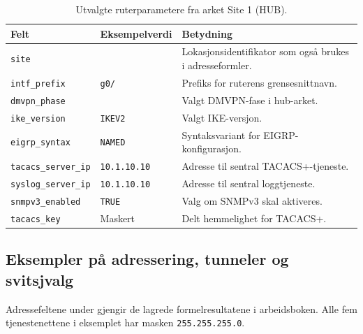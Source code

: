 \begin{table}[H]
    \centering
    \caption{Utvalgte ruterparametere fra arket Site 1 (HUB).}
    \label{tab:excel-ruterparametere}
    \small
    \renewcommand{\arraystretch}{1.35}
    \setlength{\tabcolsep}{5pt}
    \begin{tabular}{
        >{\raggedright\arraybackslash}p{4.2cm}
        >{\raggedright\arraybackslash}p{2.8cm}
        >{\raggedright\arraybackslash}p{7.4cm}
    }
        \toprule
        \rowcolor{tablegreen}
        \color{white}\textbf{Felt} &
        \color{white}\textbf{Eksempelverdi} &
        \color{white}\textbf{Betydning} \\
        \midrule
        \texttt{site} & 1 & Lokasjonsidentifikator som også brukes i adresseformler. \\
        \texttt{intf\_prefix} & \texttt{g0/} & Prefiks for ruterens grensesnittnavn. \\
        \texttt{dmvpn\_phase} & 3 & Valgt DMVPN-fase i hub-arket. \\
        \texttt{ike\_version} & \texttt{IKEV2} & Valgt IKE-versjon. \\
        \texttt{eigrp\_syntax} & \texttt{NAMED} & Syntaksvariant for EIGRP-konfigurasjon. \\
        \texttt{tacacs\_server\_ip} & \texttt{10.1.10.10} & Adresse til sentral TACACS+-tjeneste. \\
        \texttt{syslog\_server\_ip} & \texttt{10.1.10.10} & Adresse til sentral loggtjeneste. \\
        \texttt{snmpv3\_enabled} & \texttt{TRUE} & Valg om SNMPv3 skal aktiveres. \\
        \texttt{tacacs\_key} & Maskert & Delt hemmelighet for TACACS+. \\
        \bottomrule
    \end{tabular}
\end{table}

\clearpage
\subsection*{Eksempler på adressering, tunneler og svitsjvalg}

Adressefeltene under gjengir de lagrede formelresultatene i arbeidsboken.
Alle fem tjenestenettene i eksemplet har masken \texttt{255.255.255.0}.

